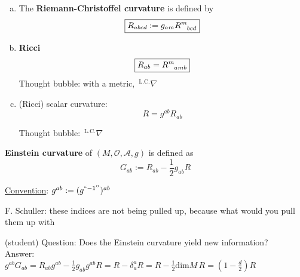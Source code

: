 \begin{definition}
\begin{enumerate}[(a)]
\item The \textbf{Riemann-Christoffel curvature} is defined by 
\begin{equation}
\boxed{R_{abcd} := g_{am}R\indices{^m_{bcd}}}
\end{equation}

\item \textbf{Ricci}
\begin{equation}
\boxed{R_{ab} = R\indices{^m_{amb}}}
\end{equation}
Thought bubble: with a metric, ${\,}^{\text{L.C.}}\nabla$

\item (Ricci) scalar curvature:
\begin{equation}
\boxed{R = g^{ab} R_{ab}}
\end{equation}

Thought bubble: ${\,}^{\text{L.C.}}\nabla$
\end{enumerate}
\end{definition}

\begin{definition}
\textbf{Einstein curvature} of $(M, \mathcal{O}, \mathcal{A}, g)$ is defined as
\begin{equation}
\boxed{G_{ab} := R_{ab} - \frac{1}{2} g_{ab} R}
\end{equation}
\end{definition}

\underline{Convention}: $g^{ab} := (g^{``-1''})^{ab}$

F. Schuller: these indices are not being pulled up, because what would you pull them up with

(student) Question: Does the Einstein curvature yield new information? \\
Answer: \\
$g^{ab} G_{ab} = R_{ab} g^{ab} - \frac{1}{2} g_{ab} g^{ab} R = R - \delta^a_a R = R - \frac{1}{2} \text{dim}M \, R = (1- \frac{d}{2}) R$
